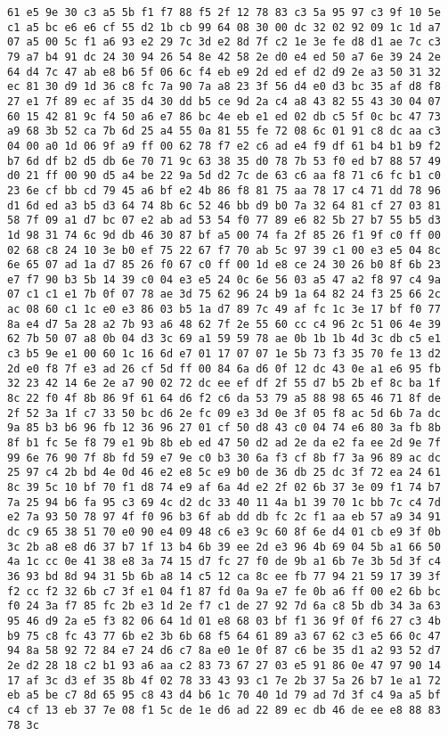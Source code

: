 \documentclass{article}
\begin{document}
\begin{verbatim}
61 e5 9e 30 c3 a5 5b f1 f7 88 f5 2f 12 78 83 c3 5a 95 97 c3 9f 10 5e c1 a5 bc e6 e6 cf 55 d2 1b cb 99 64 08 30 00 dc 32 02 92 09 1c 1d a7 07 a5 00 5c f1 a6 93 e2 29 7c 3d e2 8d 7f c2 1e 3e fe d8 d1 ae 7c c3 79 a7 b4 91 dc 24 30 94 26 54 8e 42 58 2e d0 e4 ed 50 a7 6e 39 24 2e 64 d4 7c 47 ab e8 b6 5f 06 6c f4 eb e9 2d ed ef d2 d9 2e a3 50 31 32 ec 81 30 d9 1d 36 c8 fc 7a 90 7a a8 23 3f 56 d4 e0 d3 bc 35 af d8 f8 27 e1 7f 89 ec af 35 d4 30 dd b5 ce 9d 2a c4 a8 43 82 55 43 30 04 07 60 15 42 81 9c f4 50 a6 e7 86 bc 4e eb e1 ed 02 db c5 5f 0c bc 47 73 a9 68 3b 52 ca 7b 6d 25 a4 55 0a 81 55 fe 72 08 6c 01 91 c8 dc aa c3 04 00 a0 1d 06 9f a9 ff 00 62 78 f7 e2 c6 ad e4 f9 df 61 b4 b1 b9 f2 b7 6d df b2 d5 db 6e 70 71 9c 63 38 35 d0 78 7b 53 f0 ed b7 88 57 49 d0 21 ff 00 90 d5 a4 be 22 9a 5d d2 7c de 63 c6 aa f8 71 c6 fc b1 c0 23 6e cf bb cd 79 45 a6 bf e2 4b 86 f8 81 75 aa 78 17 c4 71 dd 78 96 d1 6d ed a3 b5 d3 64 74 8b 6c 52 46 bb d9 b0 7a 32 64 81 cf 27 03 81 58 7f 09 a1 d7 bc 07 e2 ab ad 53 54 f0 77 89 e6 82 5b 27 b7 55 b5 d3 1d 98 31 74 6c 9d db 46 30 87 bf a5 00 74 fa 2f 85 26 f1 9f c0 ff 00 02 68 c8 24 10 3e b0 ef 75 22 67 f7 70 ab 5c 97 39 c1 00 e3 e5 04 8c 6e 65 07 ad 1a d7 85 26 f0 67 c0 ff 00 1d e8 ce 24 30 26 b0 8f 6b 23 e7 f7 90 b3 5b 14 39 c0 04 e3 e5 24 0c 6e 56 03 a5 47 a2 f8 97 c4 9a 07 c1 c1 e1 7b 0f 07 78 ae 3d 75 62 96 24 b9 1a 64 82 24 f3 25 66 2c ac 08 60 c1 1c e0 e3 86 03 b5 1a d7 89 7c 49 af fc 1c 3e 17 bf f0 77 8a e4 d7 5a 28 a2 7b 93 a6 48 62 7f 2e 55 60 cc c4 96 2c 51 06 4e 39 62 7b 50 07 a8 0b 04 d3 3c 69 a1 59 59 78 ae 0b 1b 1b 4d 3c db c5 e1 c3 b5 9e e1 00 60 1c 16 6d e7 01 17 07 07 1e 5b 73 f3 35 70 fe 13 d2 2d e0 f8 7f e3 ad 26 cf 5d ff 00 84 6a d6 0f 12 dc 43 0e a1 e6 95 fb 32 23 42 14 6e 2e a7 90 02 72 dc ee ef df 2f 55 d7 b5 2b ef 8c ba 1f 8c 22 f0 4f 8b 86 9f 61 64 d6 f2 c6 da 53 79 a5 88 98 65 46 71 8f de 2f 52 3a 1f c7 33 50 bc d6 2e fc 09 e3 3d 0e 3f 05 f8 ac 5d 6b 7a dc 9a 85 b3 b6 96 fb 12 36 96 27 01 cf 50 d8 43 c0 04 74 e6 80 3a fb 8b 8f b1 fc 5e f8 79 e1 9b 8b eb ed 47 50 d2 ad 2e da e2 fa ee 2d 9e 7f 99 6e 76 90 7f 8b fd 59 e7 9e c0 b3 30 6a f3 cf 8b f7 3a 96 89 ac dc 25 97 c4 2b bd 4e 0d 46 e2 e8 5c e9 b0 de 36 db 25 dc 3f 72 ea 24 61 8c 39 5c 10 bf 70 f1 d8 74 e9 af 6a 4d e2 2f 02 6b 37 3e 09 f1 74 b7 7a 25 94 b6 fa 95 c3 69 4c d2 dc 33 40 11 4a b1 39 70 1c bb 7c c4 7d e2 7a 93 50 78 97 4f f0 96 b3 6f ab dd db fc 2c f1 aa eb 57 a9 34 91 dc c9 65 38 51 70 e0 90 e4 09 48 c6 e3 9c 60 8f 6e d4 01 cb e9 3f 0b 3c 2b a8 e8 d6 37 b7 1f 13 b4 6b 39 ee 2d e3 96 4b 69 04 5b a1 66 50 4a 1c cc 0e 41 38 e8 3a 74 15 d7 fc 27 f0 de 9b a1 6b 7e 3b 5d 3f c4 36 93 bd 8d 94 31 5b 6b a8 14 c5 12 ca 8c ee fb 77 94 21 59 17 39 3f f2 cc f2 32 6b c7 3f e1 04 f1 87 fd 0a 9a e7 fe 0b a6 ff 00 e2 6b bc f0 24 3a f7 85 fc 2b e3 1d 2e f7 c1 de 27 92 7d 6a c8 5b db 34 3a 63 95 46 d9 2a e5 f3 82 06 64 1d 01 e8 68 03 bf f1 36 9f 0f f6 27 c3 4b b9 75 c8 fc 43 77 6b e2 3b 6b 68 f5 64 61 89 a3 67 62 c3 e5 66 0c 47 94 8a 58 92 72 84 e7 24 d6 c7 8a e0 1e 0f 87 c6 be 35 d1 a2 93 52 d7 2e d2 28 18 c2 b1 93 a6 aa c2 83 73 67 27 03 e5 91 86 0e 47 97 90 14 17 af 3c d3 ef 35 8b 4f 02 78 33 43 93 c1 7e 2b 37 5a 26 b7 1e a1 72 eb a5 be c7 8d 65 95 c8 43 d4 b6 1c 70 40 1d 79 ad 7d 3f c4 9a a5 bf c4 cf 13 eb 37 7e 08 f1 5c de 1e d6 ad 22 89 ec db 46 de ee e8 88 83 78 3c 
\end{verbatim}
\end{document}
